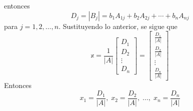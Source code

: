 \begin{theorem}
\begin{center}
    \end{center}
    entonces
    $$D_j = |B_j| = b_1A_{1j} + b_2A_{2j} + \cdots + b_nA_{nj}$$
    para $j = 1,  2,  \dots,  n$. Sustituyendo lo anterior, se sigue que
    $$\mathbb{x} = \frac{1}{|A|} \begin{bmatrix}
        D_1 \\
        D_2 \\
        \vdots \\
        D_n
    \end{bmatrix} = \begin{bmatrix}
        \displaystyle\frac{D_1}{|A|} \\[4mm]
        \displaystyle\frac{D_2}{|A|} \\[4mm]
        \vdots \\[4mm]
        \displaystyle\frac{D_n}{|A|}
    \end{bmatrix}$$
    Entonces
    $$x_1 = \frac{D_1}{|A|}, \; x_2 = \frac{D_2}{|A|}, \; \dots, \; x_n = \frac{D_n}{|A|}$$
\end{theorem}

